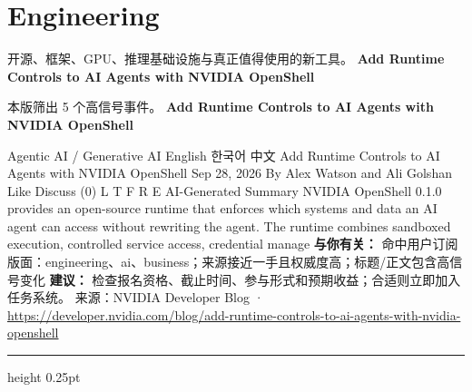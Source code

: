 \documentclass[10.5pt]{ctexart}
\begin{document}
\section*{Engineering}
{\color{ormuted} 开源、框架、GPU、推理基础设施与真正值得使用的新工具。}
\vspace{2mm}
{\LARGE\bfseries Add Runtime Controls to AI Agents with NVIDIA OpenShell}\par
\vspace{1mm}
{\color{ormuted} 本版筛出 5 个高信号事件。}
\vspace{3mm}
{\Large\bfseries Add Runtime Controls to AI Agents with NVIDIA OpenShell}\par
Agentic AI / Generative AI English 한국어 中文 Add Runtime Controls to AI Agents with NVIDIA OpenShell Sep 28, 2026 By Alex Watson and Ali Golshan Like Discuss (0) L T F R E AI-Generated Summary NVIDIA OpenShell 0.1.0 provides an open-source runtime that enforces which systems and data an AI agent can access without rewriting the agent. The runtime combines sandboxed execution, controlled service access, credential manage
\textbf{与你有关：} 命中用户订阅版面：engineering、ai、business；来源接近一手且权威度高；标题/正文包含高信号变化
\textbf{建议：} 检查报名资格、截止时间、参与形式和预期收益；合适则立即加入任务系统。
{\footnotesize\color{ormuted} 来源：NVIDIA Developer Blog · \url{https://developer.nvidia.com/blog/add-runtime-controls-to-ai-agents-with-nvidia-openshell}}
\vspace{4mm}
\hrule height 0.25pt
\vspace{3mm}
\end{document}
